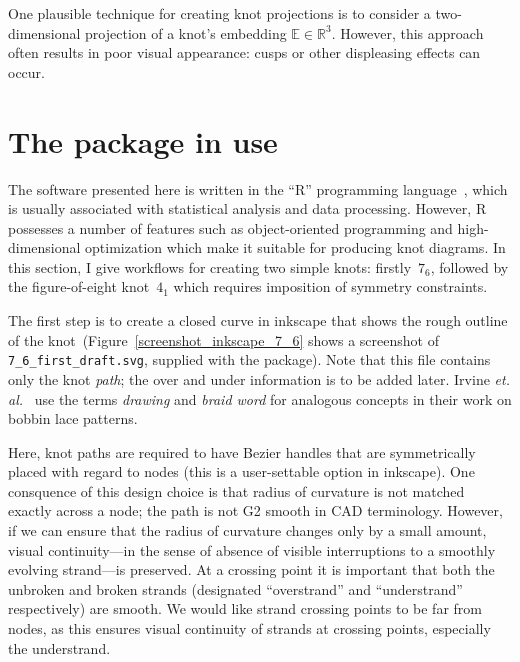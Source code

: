\documentclass{birkjour}
\theoremstyle{definition}
\theoremstyle{remark}
\numberwithin{equation}{section}
\begin{document}
One plausible technique for creating knot projections is to consider a
two-dimensional projection of a knot's embedding
$\mathbb{E}\in\mathbb{R}^3$.  However, this approach often results in
poor visual appearance: cusps or other displeasing effects can occur.

\section{The package in use}

The software presented here is written in the ``R'' programming
language~\cite{rcore2021}, which is usually associated with
statistical analysis and data processing.  However, R possesses a
number of features such as object-oriented programming and
high-dimensional optimization which make it suitable for producing
knot diagrams.  In this section, I give workflows for creating two
simple knots: firstly~$7_6$, followed by the figure-of-eight
knot~$4_1$ which requires imposition of symmetry constraints.

The first step is to create a closed curve in inkscape that shows the
rough outline of the knot~(Figure~\ref{screenshot_inkscape_7_6} shows
a screenshot of {\tt 7\_6\_first\_draft.svg}, supplied with the
package).  Note that this file contains only the knot {\em path}; the
over and under information is to be added later.  Irvine {\em
  et. al.}~\cite{irvine2020} use the terms {\em drawing} and {\em
  braid word} for analogous concepts in their work on bobbin lace
patterns.

Here, knot paths are required to have Bezier handles that are
symmetrically placed with regard to nodes (this is a user-settable
option in inkscape).  One consquence of this design choice is that
radius of curvature is not matched exactly across a node; the path is
not G2 smooth in CAD terminology.  However, if we can ensure that the
radius of curvature changes only by a small amount, visual
continuity---in the sense of absence of visible interruptions to a
smoothly evolving strand---is preserved.  At a crossing point it is
important that both the unbroken and broken strands (designated
``overstrand'' and ``understrand'' respectively) are smooth.  We would
like strand crossing points to be far from nodes, as this ensures
visual continuity of strands at crossing points, especially the
understrand.
\end{document}
